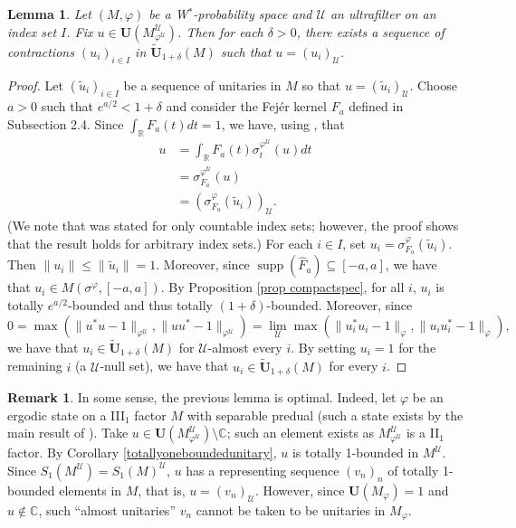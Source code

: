 \documentclass[12pt]{amsart}
\newtheorem{lem}[thm]{Lemma}
\theoremstyle{definition}
\newtheorem{remark}[thm]{Remark}
\newcommand{\C}{\mathbb{C}}
\def\cal{\mathcal}
\def\u{\mathsf 1}
\newcommand\cU{{\cal U}}
\def \u{\mathcal U}
\begin{document}
\begin{lem}\label{lem representing u by 1+deltabdd}
    Let $(M,\varphi)$ be a W$^*$-probability space and $\u$ an ultrafilter on an index set $I$.  Fix $u\in \mathbf{U}(M^{\cU}_{\varphi^{\cU}})$. Then for each $\delta>0$, there exists a sequence of contractions $(u_i)_{i\in I}$ in $\tilde{\mathbf{U}}_{1+\delta}(M)$ such that $u=(u_i)_{\cU}$.
\end{lem}
\begin{proof}
    Let $(\tilde{u}_i)_{i\in I}$ be a sequence of unitaries in $M$ so that $u=(\tilde{u}_i)_\u$. 
    Choose $a>0$ such that $e^{a/2}<1+\delta$ and consider the Fej\'er kernel $F_a$ defined in Subsection 2.4. Since $\int_{\mathbb R}F_a(t)dt=1$, we have, using \cite[Lemma 4.14]{AH14}, that
    \begin{align*}
    u&=\int_{\mathbb R}F_a(t)\sigma_t^{\varphi^{\cU}}(u)dt\\
    &=\sigma_{F_a}^{\varphi^{\cU}}(u)\\
    &=(\sigma_{F_a}^{\varphi}(\tilde{u}_i))_{\cU}.
    \end{align*}
    (We note that \cite[Lemma 4.14]{AH14} was stated for only countable index sets; however, the proof shows that the result holds for arbitrary index sets.)  For each $i\in I$, set $u_i=\sigma_{F_a}^{\varphi}(\tilde{u}_i)$. Then $\|u_i\|\le \|\tilde{u}_i\|=1$.  Moreover, since $\operatorname{supp}(\hat F_a)\subseteq [-a,a]$, we have that $u_i\in M(\sigma^{\varphi},[-a,a])$.  By Proposition \ref{prop compactspec}, for all $i$, $u_i$ is totally $e^{a/2}$-bounded and thus totally $(1+\delta)$-bounded. Moreover, since 
    \[0=\max(\|u^*u-1\|_{\varphi^{\cU}},\|uu^*-1\|_{\varphi^{\cU}})=\lim_{\cU}\max(\|u_i^*u_i-1\|_{\varphi},\|u_iu_i^*-1\|_{\varphi}),\]
    we have that $u_i\in \tilde{\mathbf{U}}_{1+\delta}(M)$ for $\cU$-almost every $i$.  By setting $u_i=1$ for the remaining $i$ (a $\cU$-null set), we have that $u_i\in \tilde{\mathbf{U}}_{1+\delta}(M)$ for every $i$. 
\end{proof}

\begin{remark}
    In some sense, the previous lemma is optimal.  Indeed, let $\varphi$ be an ergodic state on a III$_1$ factor $M$ with separable predual (such a state exists by the main result of \cite{marrakchivaes2024ergodic}). 
Take $u\in \mathbf{U}(M^{\cU}_{\varphi^{\cU}})\setminus \C$; such an element exists as $M^{\cU}_{\varphi^{\cU}}$ is a II$_1$ factor.  By Corollary \ref{totallyoneboundedunitary}, $u$ is totally 1-bounded in $M^{\cU}$. Since $S_1(M^{\cU})=S_1(M)^{\cU}$, $u$ has a representing sequence $(v_n)_n$ of totally 1-bounded elements in $M$, that is, $u=(v_n)_{\cU}$. However, since $\mathbf{U}(M_{\varphi})=1$ and $u\notin \C$, such ``almost unitaries'' $v_n$ cannot be taken to be unitaries in $M_\varphi$.
\end{remark}
\end{document}
